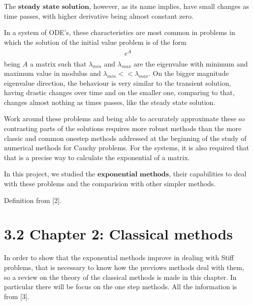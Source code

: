 \documentclass[letterpaper,10pt,english]{jupyterBook}
\begin{document}
\sphinxAtStartPar
The \(\textbf{steady state solution}\), however, as its name implies, have small changes as time passes, with higher derivative being almost constant zero.

\sphinxAtStartPar
In a system of ODE’s, these characteristics are most common in problems in which the solution of the initial value problem is of the form
\begin{equation*}
\begin{split}
\begin{align*}
e^{A}
\end{align*}
\end{split}
\end{equation*}
\sphinxAtStartPar
being \(A\) a matrix such that \(\lambda_{min}\) and \(\lambda_{max}\) are the eigenvalue with minimum and maximum value in modulus and \(\lambda_{min} << \lambda_{max}\). On the bigger magnitude eigenvalue direction, the behaviour is very similar to the transient solution, having drastic changes over time and on the smaller one, comparing to that, changes almost nothing as times passes, like the steady state solution.

\sphinxAtStartPar
Work around these problems and being able to accurately approximate these so contrasting parts of the solutions requires more robust methods than the more classic and common one\sphinxhyphen{}step methods addressed at the beginning of the study of numerical methods for Cauchy problems. For the systems, it is also required that that is a precise way to calculate the exponential of a matrix.

\sphinxAtStartPar
In this project, we studied the \(\textbf{exponential methods}\), their capabilities to deal with these problems and the comparision with other simpler methods.

\sphinxAtStartPar
Definition from {[}2{]}.

\sphinxstepscope


\section{3.2 Chapter 2: Classical methods}
\label{\detokenize{cap2:chapter-2-classical-methods}}\label{\detokenize{cap2::doc}}
\sphinxAtStartPar
In order to show that the exponential methods improve in dealing with Stiff problems, that is necessary to know how the previows methods deal with them, so a review on the theory of the classical methods is made in this chapter. In particular there will be focus on the one step methods. All the information is from {[}3{]}.
\end{document}
